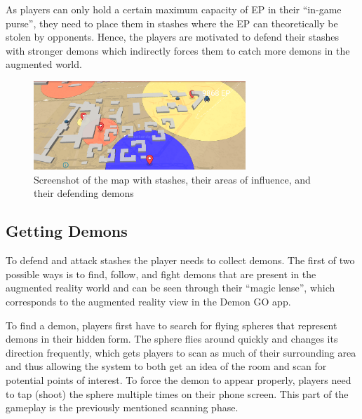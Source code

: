 As players can only hold a certain maximum capacity of EP in their \enquote{in-game purse}, they need to place them in stashes where the EP can theoretically be stolen by opponents. 
Hence, the players are motivated to defend their stashes with stronger demons which indirectly forces them to catch more demons in the augmented world.

\begin{figure}
    \centering
    \includegraphics[width=8cm]{graphics/map.png}
    \caption{Screenshot of the map with stashes, their areas of influence, and their defending demons}
    \label{fig:map}
\end{figure}




\subsection{Getting Demons}
\label{subsec:demons}

To defend and attack stashes the player needs to collect demons.
The first of two possible ways is to find, follow, and fight demons that are present in the augmented reality world and can be seen through their \enquote{magic lense}, which corresponds to the augmented reality view in the Demon GO app.

To find a demon, players first have to search for flying spheres that represent demons in their hidden form.
The sphere flies around quickly and changes its direction frequently, which gets players to scan as much of their surrounding area and thus allowing the system to both get an idea of the room and scan for potential points of interest.
To force the demon to appear properly, players need to tap (shoot) the sphere multiple times on their phone screen. This part of the gameplay is the previously mentioned scanning phase.

